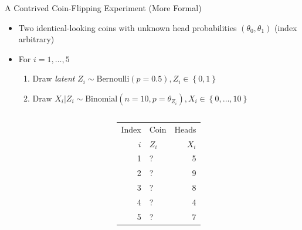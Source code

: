 \documentclass[dvipdfmx,bigger,aspectratio=169]{beamer}
\begin{document}
\begin{frame}[label={sec:org46c4d52}]{A Contrived Coin-Flipping Experiment (More Formal)}
\begin{itemize}
\item Two identical-looking coins with unknown head probabilities \((\theta_{0},\theta_{1})\) (index arbitrary)
\item For \(i = 1, \dots, 5\)
\begin{enumerate}
\item Draw \emph{latent} \(Z_{i} \sim \text{Bernoulli}(p = 0.5), Z_{i} \in \left\{ 0,1 \right\}\)
\item Draw \(X_{i} | Z_{i} \sim \text{Binomial}(n = 10, p = \theta_{Z_{i}}), X_{i} \in \left\{ 0, \dots, 10 \right\}\)
\end{enumerate}
\end{itemize}
\begin{columns}
\begin{column}{0.50\columnwidth}
\begin{center}
\end{center}
\end{column}

\begin{column}{0.50\columnwidth}
\begin{center}
\begin{tabular}{rlr}
Index & Coin & Heads\\
\(i\) & \(Z_{i}\) & \(X_{i}\)\\
\hline
1 & ? & 5\\
2 & ? & 9\\
3 & ? & 8\\
4 & ? & 4\\
5 & ? & 7\\
\end{tabular}
\end{center}
\end{column}
\end{columns}
\end{frame}
\end{document}
